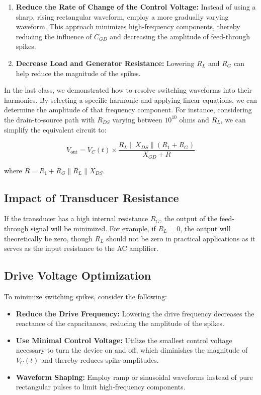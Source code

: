 \begin{enumerate}
    \item \textbf{Reduce the Rate of Change of the Control Voltage:} Instead of using a sharp, rising rectangular waveform, employ a more gradually varying waveform. This approach minimizes high-frequency components, thereby reducing the influence of \( C_{GD} \) and decreasing the amplitude of feed-through spikes.
    
    \item \textbf{Decrease Load and Generator Resistance:} Lowering \( R_L \) and \( R_G \) can help reduce the magnitude of the spikes. 
\end{enumerate}

In the last class, we demonstrated how to resolve switching waveforms into their harmonics. By selecting a specific harmonic and applying linear equations, we can determine the amplitude of that frequency component. For instance, considering the drain-to-source path with \( R_{DS} \) varying between \( 10^{10} \) ohms and \( R_L \), we can simplify the equivalent circuit to:

\[
V_{\text{out}} = V_C(t) \times \frac{R_L \parallel X_{DS} \parallel (R_1 + R_G)}{X_{GD} + R}
\]

where \( R = R_1 + R_G \parallel R_L \parallel X_{DS} \).

\subsection{Impact of Transducer Resistance}

If the transducer has a high internal resistance \( R_G \), the output of the feed-through signal will be minimized. For example, if \( R_L = 0 \), the output will theoretically be zero, though \( R_L \) should not be zero in practical applications as it serves as the input resistance to the AC amplifier.

\subsection{Drive Voltage Optimization}

To minimize switching spikes, consider the following:

\begin{itemize}
    \item \textbf{Reduce the Drive Frequency:} Lowering the drive frequency decreases the reactance of the capacitances, reducing the amplitude of the spikes.
    
    \item \textbf{Use Minimal Control Voltage:} Utilize the smallest control voltage necessary to turn the device on and off, which diminishes the magnitude of \( V_C(t) \) and thereby reduces spike amplitudes.
    
    \item \textbf{Waveform Shaping:} Employ ramp or sinusoidal waveforms instead of pure rectangular pulses to limit high-frequency components.
\end{itemize}

